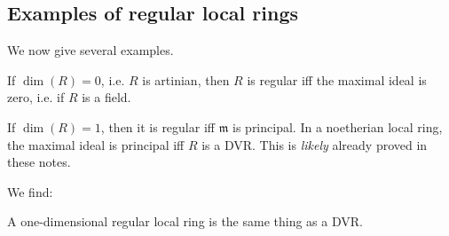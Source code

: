 \subsection{Examples of regular local rings}
We now give several examples.
\begin{example} 
If $\dim(R)=0$, i.e. $R$ is artinian, then $R$ is regular iff the maximal ideal
is zero, i.e. if $R$ is a field.
\end{example} 

\begin{example} 
If $\dim(R) =1$, then it is regular iff $\mathfrak{m}$ is principal. In a
noetherian local ring, the maximal ideal is principal iff $R$ is a DVR.
This is \emph{likely} already proved in these notes. 
\end{example} 
We find:
\begin{proposition} 
A one-dimensional regular local ring is the same thing as a DVR.
\end{proposition} 

